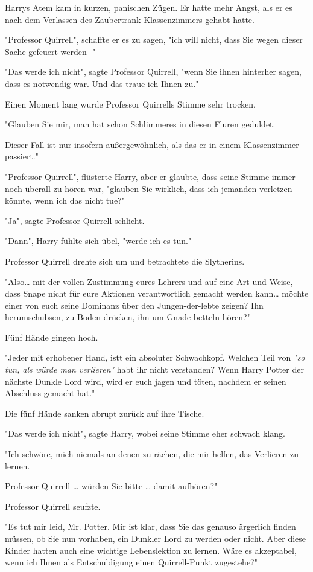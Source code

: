 {Harrys Atem kam in kurzen, panischen Zügen. Er hatte mehr Angst, als er es nach dem Verlassen des Zaubertrank-Klassenzimmers gehabt hatte.

"Professor Quirrell", schaffte er es zu sagen, "ich will nicht, dass Sie wegen dieser Sache gefeuert werden -"

"Das werde ich nicht", sagte Professor Quirrell, "wenn Sie ihnen hinterher sagen, dass es notwendig war. Und das traue ich Ihnen zu."

Einen Moment lang wurde Professor Quirrells Stimme sehr trocken.

"Glauben Sie mir, man hat schon Schlimmeres in diesen Fluren geduldet.

Dieser Fall ist nur insofern außergewöhnlich, als das er in einem Klassenzimmer passiert."

"Professor Quirrell", flüsterte Harry, aber er glaubte, dass seine Stimme immer noch überall zu hören war, "glauben Sie wirklich, dass ich jemanden verletzen könnte, wenn ich das nicht tue?"

"Ja", sagte Professor Quirrell schlicht.

"Dann", Harry fühlte sich übel, "werde ich es tun."

Professor Quirrell drehte sich um und betrachtete die Slytherins.

"Also… mit der vollen Zustimmung eures Lehrers und auf eine Art und Weise, dass Snape nicht für eure Aktionen verantwortlich gemacht werden kann… möchte einer von euch seine Dominanz über den Jungen-der-lebte zeigen? Ihn herumschubsen, zu Boden drücken, ihn um Gnade betteln hören?"

Fünf Hände gingen hoch.

"Jeder mit erhobener Hand, istt ein absoluter Schwachkopf. Welchen Teil von \emph{"so tun, als würde man verlieren"} habt ihr nicht verstanden? Wenn Harry Potter der nächste Dunkle Lord wird, wird er euch jagen und töten, nachdem er seinen Abschluss gemacht hat."

Die fünf Hände sanken abrupt zurück auf ihre Tische.

"Das werde ich nicht", sagte Harry, wobei seine Stimme eher schwach klang.

"Ich schwöre, mich niemals an denen zu rächen, die mir helfen, das Verlieren zu lernen.

Professor Quirrell … würden Sie bitte … damit aufhören?"

Professor Quirrell seufzte.

"Es tut mir leid, Mr. Potter. Mir ist klar, dass Sie das genauso ärgerlich finden müssen, ob Sie nun vorhaben, ein Dunkler Lord zu werden oder nicht. Aber diese Kinder hatten auch eine wichtige Lebenslektion zu lernen. Wäre es akzeptabel, wenn ich Ihnen als Entschuldigung einen Quirrell-Punkt zugestehe?"

}
